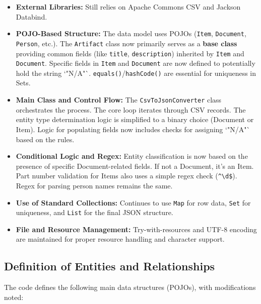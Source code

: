 \begin{itemize}
    \item \textbf{External Libraries:} Still relies on Apache Commons CSV and Jackson Databind.

    \item \textbf{POJO-Based Structure:} The data model uses POJOs (\texttt{Item}, \texttt{Document}, \texttt{Person}, etc.). The \texttt{Artifact} class now primarily serves as a \textbf{base class} providing common fields (like \texttt{title}, \texttt{description}) inherited by \texttt{Item} and \texttt{Document}. Specific fields in \texttt{Item} and \texttt{Document} are now defined to potentially hold the string `"N/A"`. \texttt{equals()}/\texttt{hashCode()} are essential for uniqueness in Sets.

    \item \textbf{Main Class and Control Flow:} The \texttt{CsvToJsonConverter} class orchestrates the process. The core loop iterates through CSV records. The entity type determination logic is simplified to a binary choice (Document or Item). Logic for populating fields now includes checks for assigning `"N/A"` based on the rules.

    \item \textbf{Conditional Logic and Regex:} Entity classification is now based on the presence of specific Document-related fields. If not a Document, it's an Item. Part number validation for Items also uses a simple regex check (\texttt{\^{}\textbackslash{}d\$}). Regex for parsing person names remains the same.

    \item \textbf{Use of Standard Collections:} Continues to use \texttt{Map} for row data, \texttt{Set} for uniqueness, and \texttt{List} for the final JSON structure.

    \item \textbf{File and Resource Management:} Try-with-resources and UTF-8 encoding are maintained for proper resource handling and character support.
\end{itemize}

\subsection{Definition of Entities and Relationships}
The code defines the following main data structures (POJOs), with modifications noted:

